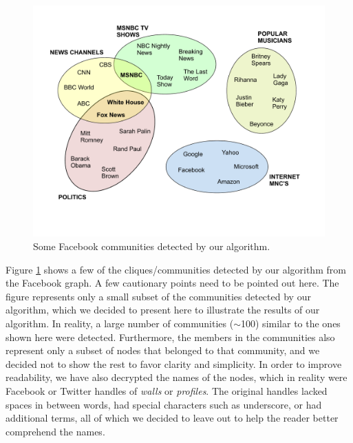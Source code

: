 \begin{figure}%
  \centering
    \includegraphics[scale=0.25]{communities_fb.pdf}
    
  \caption{Some Facebook communities detected by our algorithm.}
\label{fig-communities-fb}
\end{figure}

Figure \ref{fig-communities-fb} shows a few of the cliques/communities detected by our algorithm from the Facebook graph. A few cautionary points need to be pointed out here. The figure represents only a small subset of the communities detected by our algorithm, which we decided to present here to illustrate the results of our algorithm. In reality, a large number of communities ($\sim$100) similar to the ones shown here were detected. Furthermore, the members in the communities also represent only a subset of nodes that belonged to that community, and we decided not to show the rest to favor clarity and simplicity. In order to improve readability, we have also decrypted the names of the nodes, which in reality were Facebook or Twitter handles of {\it walls} or {\it profiles}. The original handles lacked spaces in between words, had special characters such as underscore, or had additional terms, all of which we decided to leave out to help the reader better comprehend the names.

